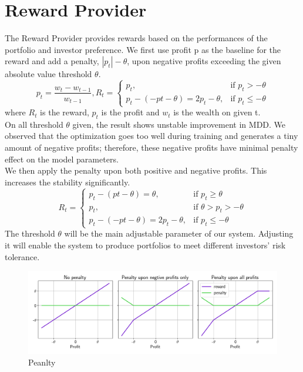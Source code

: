 \section {Reward Provider}
The Reward Provider provides rewards based on the performances of the portfolio and investor preference. We first use profit p as the baseline for the reward and add a penalty, \(|p_t|-\theta\), upon negative profits exceeding the given absolute value threshold \(\theta\). 
\[
p_t = \frac{w_t-w_{t-1}}{w_{t-1}}
, 
R_t = 
\begin{cases}
    p_t,&\text{if  }p_t > -\theta\\
    p_t - (-pt - \theta) =  2p_t - \theta ,&\text{if  } p_t\leq  -\theta
\end{cases}
\]
where \(R_t\) is the reward, \(p_t\) is the profit and \(w_t\) is the wealth on given t.
\\
On all threshold \(\theta\) given, the result shows unstable improvement in MDD. We observed that the optimization goes too well during training and generates a tiny amount of negative profits; therefore, these negative profits have minimal penalty effect on the model parameters.
\\
We then apply the penalty upon both positive and negative profits. This increases the stability significantly.
\[
R_t = 
\begin{cases}
    p_t - (pt-\theta) = \theta,&\text{if  } p_t\geq \theta\\
    p_t,&\text{if  }    \theta > p_t > -\theta\\
    p_t - (-pt - \theta) =  2p_t - \theta ,&\text{if  } p_t\leq  -\theta
\end{cases}
\]
The threshold \(\theta\) will be the main adjustable parameter of our system. Adjusting it will enable the system to produce portfolios to meet different investors' risk tolerance.
\begin{figure}
    \centering
    \includegraphics[width=15cm]{images/reward.png}
    \caption{Peanlty}
    \label{fig:peanlty}
\end{figure}


